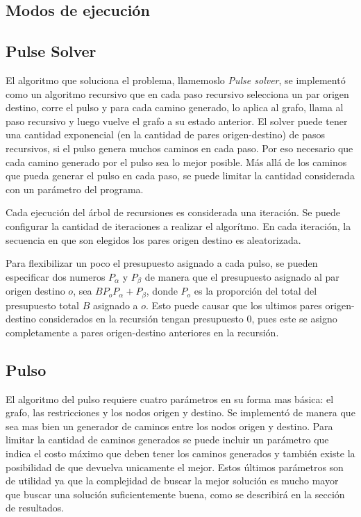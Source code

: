 \documentclass{article}
\begin{document}
  \subsection*{Modos de ejecución}

  \subsection*{Pulse Solver}

  El algoritmo que soluciona el problema, llamemoslo {\it Pulse solver}, se implementó como un algoritmo recursivo que en cada paso recursivo selecciona un par origen destino, corre el pulso y para cada camino generado, lo aplica al grafo, llama al paso recursivo y luego vuelve el grafo a su estado anterior. El solver puede tener una cantidad exponencial (en la cantidad de pares origen-destino) de pasos recursivos, si el pulso genera muchos caminos en cada paso. Por eso necesario que cada camino generado por el pulso sea lo mejor posible. Más allá de los caminos que pueda generar el pulso en cada paso, se puede limitar la cantidad considerada con un parámetro del programa.

  Cada ejecución del árbol de recursiones es considerada una iteración. Se puede configurar la cantidad de iteraciones a realizar el algorítmo. En cada iteración, la secuencia en que son elegidos los pares origen destino es aleatorizada.

  Para flexibilizar un poco el presupuesto asignado a cada pulso, se pueden especificar dos numeros $P_{\alpha}$ y $P_{\beta}$ de manera que el presupuesto asignado al par origen destino $o$, sea $BP_oP_{\alpha} + P_{\beta}$, donde $P_o$ es la proporción del total del presupuesto total $B$ asignado a $o$. Esto puede causar que los ultimos pares origen-destino considerados en la recursión tengan presupuesto $0$, pues este se asigno completamente a pares origen-destino anteriores en la recursión.

  \subsection*{Pulso}

  El algoritmo del pulso requiere cuatro parámetros en su forma mas básica: el grafo, las restricciones y los nodos origen y destino. Se implementó de manera que sea mas bien un generador de caminos entre los nodos origen y destino. Para limitar la cantidad de caminos generados se puede incluir un parámetro que indica el costo máximo que deben tener los caminos generados y también existe la posibilidad de que devuelva unicamente el mejor. Estos últimos parámetros son de utilidad ya que la complejidad de buscar la mejor solución es mucho mayor que buscar una solución suficientemente buena, como se describirá en la sección de resultados.
\end{document}

